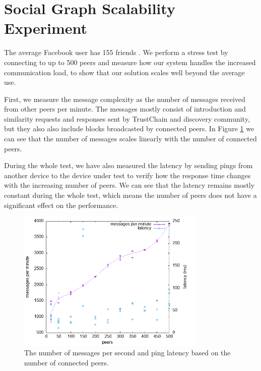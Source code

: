 \section{Social Graph Scalability Experiment}

The average Facebook user has 155 friends \cite{facebookfriends}. We perform a stress test by connecting to up to 500 peers and measure how our system handles the increased communication load, to show that our solution scales well beyond the average use.

First, we measure the message complexity as the number of messages received from other peers per minute. The messages mostly consist of introduction and similarity requests and responses sent by TrustChain and discovery community, but they also also include blocks broadcasted by connected peers. In Figure \ref{message_complexity} we can see that the number of messages scales linearly with the number of connected peers.

During the whole test, we have also measured the latency by sending pings from another device to the device under test to verify how the response time changes with the increasing number of peers. We can see that the latency remains mostly constant during the whole test, which means the number of peers does not have a significant effect on the performance.

\begin{figure}[h!]
    \centering
    \includegraphics[width=0.8\textwidth]{plots/latency}
    \caption{The number of messages per second and ping latency based on the number of connected peers.}
    \label{message_complexity}
\end{figure}


